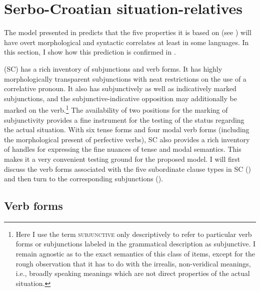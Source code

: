 \documentclass[output=paper]{langscibook}
\begin{document}

\section{Serbo-Croatian situation-relatives}\label{sec:SC-c-rel}

The model presented in  predicts that the five properties it is based on (see ) will have overt morphological and syntactic correlates at least in some languages. In this section, I show how this prediction is confirmed in .

 (SC) has a rich inventory of subjunctions and verb forms. It has highly morphologically transparent subjunctions with neat restrictions on the use of a correlative pronoun. It also has subjunctively as well as indicatively marked subjunctions, and the subjunctive-indicative opposition may additionally be marked on the verb.\footnote{Here I use the term \textsc{subjunctive} only descriptively to refer to particular verb forms or subjunctions labeled in the grammatical description as subjunctive. I remain agnostic as to the exact semantics of this class of items, except for the rough observation that it has to do with the irrealis, non-veridical meanings, i.e., broadly speaking meanings which are not direct properties of the actual situation.} The availability of two positions for the marking of subjunctivity provides a fine instrument for the testing of the status regarding the actual situation. With six tense forms and four modal verb forms (including the morphological present of perfective verbs), SC also provides a rich inventory of handles for expressing the fine nuances of tense and modal semantics. This makes it a very convenient testing ground for the proposed model. I will first discuss the verb forms associated with the five subordinate clause types in SC  () and then turn to the corresponding subjunctions ().

\subsection{Verb forms}\label{verbforms}
\end{document}
